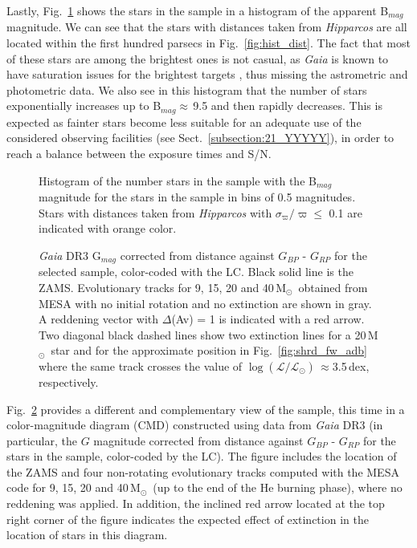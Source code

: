 \documentclass{aa}
\newcommand{\MSol}{\mbox{M$_\odot$}}
\newcommand{\logLs}{$\log (\mathcal{L}/\mathcal{L}_{\odot})$}
\begin{document}
Lastly, Fig.~\ref{fig:hist_Bmag} shows the stars in the sample in a histogram of the apparent B$_{mag}$ magnitude. We can see that the stars with distances taken from \textit{Hipparcos} are all located within the first hundred parsecs in Fig.~\ref{fig:hist_dist}. The fact that most of these stars are among the brightest ones is not casual, as {\it Gaia} is known to have saturation issues for the brightest targets \citep[see][]{2018A&A...616A...2L}, thus missing the astrometric and photometric data. We also see in this histogram that the number of stars exponentially increases up to B$_{mag}\approx$\,9.5 and then rapidly decreases. This is expected as fainter stars become less suitable for an adequate use of the considered observing facilities (see Sect.~\ref{subsection:21_YYYYY}), in order to reach a balance between the exposure times and S/N. 

\begin{figure}[t!]
\centering
{}
\caption{Histogram of the number stars in the sample with the B$_{mag}$ magnitude for the stars in the sample in bins of 0.5 magnitudes. Stars with distances taken from \textit{Hipparcos} with $\sigma_{\varpi}/\varpi \leq$ 0.1 are indicated with orange color.}
\label{fig:hist_Bmag}
\end{figure}

\begin{figure}[!t]
\centering
{}
\caption{{\em Gaia} DR3 G$_{mag}$ corrected from distance against $G_{BP}$ - $G_{RP}$ for the selected sample, color-coded with the LC. Black solid line is the ZAMS. Evolutionary tracks for 9, 15, 20 and 40\,\MSol\ obtained from MESA with no initial rotation and no extinction are shown in gray. A reddening vector with $\Delta$(Av) = 1 is indicated with a red arrow. Two diagonal black dashed lines show two extinction lines for a 20\,\MSol\ star and for the approximate position in Fig.~\ref{fig:shrd_fw_adb} where the same track crosses the value of \logLs\,$\approx$3.5\,dex, respectively.}
\label{fig:gaia_phot}
\end{figure}

Fig.~\ref{fig:gaia_phot} provides a different and complementary view of the sample, this time in a color-magnitude diagram (CMD) constructed using data from {\em Gaia} DR3 (in particular, the $G$ magnitude corrected from distance against $G_{BP}$ - $G_{RP}$ for the stars in the sample, color-coded by the LC). The figure includes the location of the ZAMS and four non-rotating evolutionary tracks computed with the MESA code for 9, 15, 20 and 40\,\MSol\ (up to the end of the He burning phase), where no reddening was applied. In addition, the inclined red arrow located at the top right corner of the figure indicates the expected effect of extinction in the location of stars in this diagram. 
\end{document}
